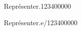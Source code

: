 \begin{pageAD}
\begin{ExoCad}{Représenter.}{1234}{0}{0}{0}{0}{0}

 
 
\end{ExoCad}









\begin{ExoCad}{Représenter.}{e/1234}{0}{0}{0}{0}{0}

 
 
\end{ExoCad}



 
\end{pageAD}
 
